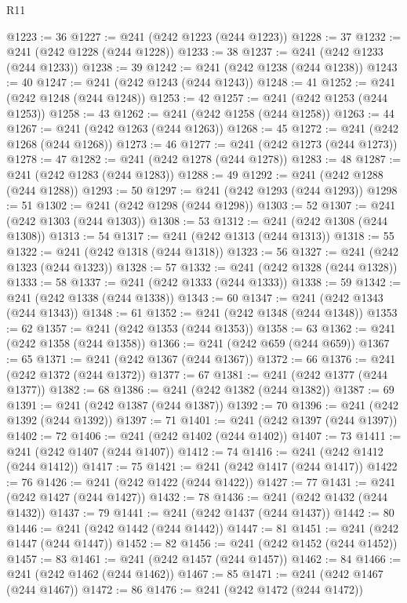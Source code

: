 \begin{lexlean}{R11}
\begin{coremodule}
{{{{{{{{{{{{{{{{{{{{{{{{{{{{{{{{{{{{{{{{{{{{{{{{{{{{{{{{{{{{{{{{{{{{{{{{{{{{{{{{{{{{{{{{{{{{{{{{{{{{{{{{{{@1223 := 36
@1227 := @241 (@242 @1223 (@244 @1223))
@1228 := 37
@1232 := @241 (@242 @1228 (@244 @1228))
@1233 := 38
@1237 := @241 (@242 @1233 (@244 @1233))
@1238 := 39
@1242 := @241 (@242 @1238 (@244 @1238))
@1243 := 40
@1247 := @241 (@242 @1243 (@244 @1243))
@1248 := 41
@1252 := @241 (@242 @1248 (@244 @1248))
@1253 := 42
@1257 := @241 (@242 @1253 (@244 @1253))
@1258 := 43
@1262 := @241 (@242 @1258 (@244 @1258))
@1263 := 44
@1267 := @241 (@242 @1263 (@244 @1263))
@1268 := 45
@1272 := @241 (@242 @1268 (@244 @1268))
@1273 := 46
@1277 := @241 (@242 @1273 (@244 @1273))
@1278 := 47
@1282 := @241 (@242 @1278 (@244 @1278))
@1283 := 48
@1287 := @241 (@242 @1283 (@244 @1283))
@1288 := 49
@1292 := @241 (@242 @1288 (@244 @1288))
@1293 := 50
@1297 := @241 (@242 @1293 (@244 @1293))
@1298 := 51
@1302 := @241 (@242 @1298 (@244 @1298))
@1303 := 52
@1307 := @241 (@242 @1303 (@244 @1303))
@1308 := 53
@1312 := @241 (@242 @1308 (@244 @1308))
@1313 := 54
@1317 := @241 (@242 @1313 (@244 @1313))
@1318 := 55
@1322 := @241 (@242 @1318 (@244 @1318))
@1323 := 56
@1327 := @241 (@242 @1323 (@244 @1323))
@1328 := 57
@1332 := @241 (@242 @1328 (@244 @1328))
@1333 := 58
@1337 := @241 (@242 @1333 (@244 @1333))
@1338 := 59
@1342 := @241 (@242 @1338 (@244 @1338))
@1343 := 60
@1347 := @241 (@242 @1343 (@244 @1343))
@1348 := 61
@1352 := @241 (@242 @1348 (@244 @1348))
@1353 := 62
@1357 := @241 (@242 @1353 (@244 @1353))
@1358 := 63
@1362 := @241 (@242 @1358 (@244 @1358))
@1366 := @241 (@242 @659 (@244 @659))
@1367 := 65
@1371 := @241 (@242 @1367 (@244 @1367))
@1372 := 66
@1376 := @241 (@242 @1372 (@244 @1372))
@1377 := 67
@1381 := @241 (@242 @1377 (@244 @1377))
@1382 := 68
@1386 := @241 (@242 @1382 (@244 @1382))
@1387 := 69
@1391 := @241 (@242 @1387 (@244 @1387))
@1392 := 70
@1396 := @241 (@242 @1392 (@244 @1392))
@1397 := 71
@1401 := @241 (@242 @1397 (@244 @1397))
@1402 := 72
@1406 := @241 (@242 @1402 (@244 @1402))
@1407 := 73
@1411 := @241 (@242 @1407 (@244 @1407))
@1412 := 74
@1416 := @241 (@242 @1412 (@244 @1412))
@1417 := 75
@1421 := @241 (@242 @1417 (@244 @1417))
@1422 := 76
@1426 := @241 (@242 @1422 (@244 @1422))
@1427 := 77
@1431 := @241 (@242 @1427 (@244 @1427))
@1432 := 78
@1436 := @241 (@242 @1432 (@244 @1432))
@1437 := 79
@1441 := @241 (@242 @1437 (@244 @1437))
@1442 := 80
@1446 := @241 (@242 @1442 (@244 @1442))
@1447 := 81
@1451 := @241 (@242 @1447 (@244 @1447))
@1452 := 82
@1456 := @241 (@242 @1452 (@244 @1452))
@1457 := 83
@1461 := @241 (@242 @1457 (@244 @1457))
@1462 := 84
@1466 := @241 (@242 @1462 (@244 @1462))
@1467 := 85
@1471 := @241 (@242 @1467 (@244 @1467))
@1472 := 86
@1476 := @241 (@242 @1472 (@244 @1472))
}}}}}}}}}}}}}}}}}}}}}}}}}}}}}}}}}}}}}}}}}}}}}}}}}}}}}}}}}}}}}}}}}}}}}}}}}}}}}}}}}}}}}}}}}}}}}}}}}}}}}}}}}}
\end{coremodule}
\end{lexlean}
